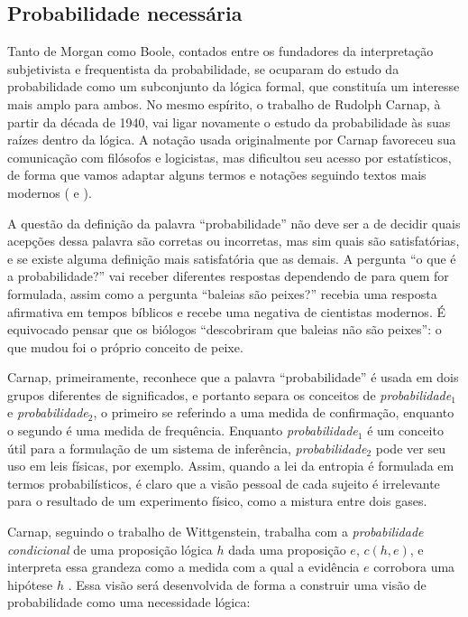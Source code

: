 \begin{shaded}
\section{Probabilidade necessária}

Tanto de Morgan como Boole, contados entre os fundadores da interpretação subjetivista e frequentista da probabilidade,
se ocuparam do estudo da probabilidade como um subconjunto da lógica formal, que constituía um interesse mais amplo para
ambos. No mesmo espírito, o trabalho de Rudolph Carnap, à partir da década de 1940, vai ligar novamente o estudo da probabilidade
às suas raízes dentro da lógica. A notação usada originalmente por Carnap favoreceu sua comunicação com filósofos e logicistas,
mas dificultou seu acesso por estatísticos, de forma que vamos adaptar alguns termos e notações seguindo textos mais
modernos (\citep{Zabell09} e \citep{Fitelson07}). 

A questão da definição da palavra ``probabilidade'' não deve ser a de decidir quais acepções dessa palavra são
corretas ou incorretas, mas sim quais são satisfatórias, e se existe alguma definição mais satisfatória que as demais.
A pergunta ``o que é a probabilidade?''
vai receber diferentes respostas dependendo de para quem for formulada, assim como a pergunta ``baleias são peixes?''
recebia uma resposta afirmativa em tempos bíblicos e recebe uma negativa de cientistas modernos. É equivocado pensar que os
biólogos ``descobriram que baleias não são peixes'': o que mudou foi o próprio conceito de peixe. 

Carnap, primeiramente, reconhece que a palavra ``probabilidade'' é usada em
dois grupos diferentes de significados, e 
portanto separa os conceitos de {\em probabilidade$_1$} e {\em probabilidade$_2$}, o primeiro
se referindo a uma medida de confirmação, enquanto o segundo é uma medida de frequência. Enquanto {\em probabilidade$_1$} é
um conceito útil para a formulação de um sistema de inferência, {\em probabilidade$_2$} pode ver seu uso em leis físicas, por
exemplo. Assim, quando a lei da entropia é formulada em termos probabilísticos, é claro que a visão pessoal de cada sujeito
é irrelevante para o resultado de um experimento físico, como a mistura entre dois gases. 

Carnap, seguindo o trabalho de 
Wittgenstein, trabalha com a {\em probabilidade condicional} de uma proposição lógica $h$ dada uma proposição $e$, $c(h, e)$, 
e interpreta essa grandeza como a medida com a qual a evidência $e$ corrobora uma hipótese $h$ \citep{Zabell09}.
Essa visão será desenvolvida de forma a construir uma visão de probabilidade como uma necessidade lógica:


\end{shaded}
